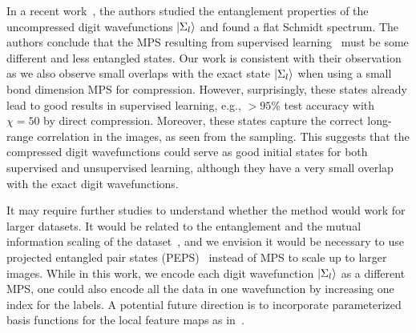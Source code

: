 \documentclass[nonatbib]{article}
\newcommand{\citet}{\cite}
\newcommand{\citep}{\cite}
\begin{document}
In a recent work~\citet{martyn2020entanglement}, the authors studied the entanglement properties of the uncompressed digit wavefunctions $\ket{\Sigma_l}$ and found a flat Schmidt spectrum.
The authors conclude that the MPS resulting from supervised learning~\citep{stoudenmire2016supervised} must be some different and less entangled states.
Our work is consistent with their observation as we also observe small overlaps with the exact state $\ket{\Sigma_l}$ when using a small bond dimension MPS for compression.
However, surprisingly, these states already lead to good results in supervised learning, e.g., $>95\%$ test accuracy with $\chi=50$ by direct compression.
Moreover, these states capture the correct long-range correlation in the images, as seen from the sampling.
This suggests that the compressed digit wavefunctions could serve as good initial states for both supervised and unsupervised learning, although they have a very small overlap with the exact digit wavefunctions.
    
    
    
It may require further studies to understand whether the method would work for larger datasets.
It would be related to the entanglement and the mutual information scaling of the dataset~\citep{lu2021tensor}, and we envision it would be necessary to use projected entangled pair states (PEPS)~\cite{verstraete2004renormalization,niggemann1997quantum,nishino1998density,sierra1998density} instead of MPS to scale up to larger images.
While in this work, we encode each digit wavefunction $\ket{\Sigma_l}$ as a different MPS, one could also encode all the data in one wavefunction by increasing one index for the labels.
A potential future direction is to incorporate parameterized basis functions for the local feature maps as in~\citep{salimans2017pixelcnn++,hashemi2017chebfun,gorodetsky2019continuous}.



    
\end{document}
